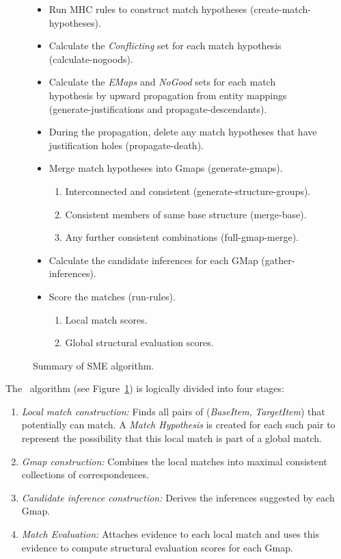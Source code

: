 \begin{figure}
\border
\begin{small}
\begin{tt}
\begin{itemize}
 \item Run MHC rules to construct match hypotheses (create-match-hypotheses).
 \item Calculate the {\it Conflicting} set for each match hypothesis (calculate-nogoods).
 \item Calculate the {\it EMaps} and {\it NoGood} sets for each match
        hypothesis by upward propagation from entity mappings
        (generate-justifications and propagate-descendants).
 \item During the propagation, delete any match hypotheses that have
        justification holes (propagate-death).
 \item Merge match hypotheses into Gmaps (generate-gmaps).
      \begin{enumerate}
         \item Interconnected and consistent (generate-structure-groups).
         \item Consistent members of same base structure (merge-base).
         \item Any further consistent combinations (full-gmap-merge).
      \end{enumerate}
 \item Calculate the candidate inferences for each GMap (gather-inferences).
 \item Score the matches (run-rules).
      \begin{enumerate}
         \item Local match scores.
         \item Global structural evaluation scores.
      \end{enumerate}
\end{itemize}
\end{tt}
\end{small}
  \caption{Summary of SME algorithm.}
  \label{fg:sme-overview}
\border
\end{figure}


The \SME\  algorithm (see Figure~\ref{fg:sme-overview}) is logically divided
into four stages:
\begin{enumerate} 
\item {\em Local match construction:} Finds all pairs of ({\it BaseItem},
{\it TargetItem}) that potentially can match.  A {\em Match Hypothesis} is
created for each such pair to represent the possibility that this local
match is part of a global match.
\item {\em Gmap construction:} Combines the local matches into maximal
consistent collections of correspondences.
\item {\em Candidate inference construction:} Derives the inferences
suggested by each Gmap.
\item {\em Match Evaluation:} Attaches evidence to each local match and
uses this evidence to compute structural evaluation scores for each Gmap. 
\end{enumerate}

